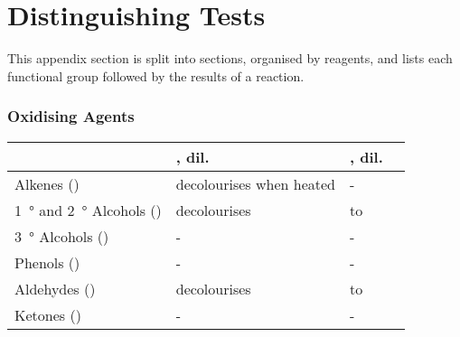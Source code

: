 
\pagebreak
\hypertarget{AppendixDistinguishingTests}{}
\part{Distinguishing Tests}

	This appendix section is split into sections, organised by reagents, and lists each functional group
	followed by the results of a reaction.

	\section{Oxidising Agents}

		\vspace{1em}
		\begin{center}
		\begin{longtabu} to \textwidth {| X[c,m] | X[c,m] | X[c,m] | N}

		\hline
							&	, dil. \ch{H2SO4}	&	 , dil. 	&\\[8mm]\hline

		Alkenes ()	&	 decolourises when heated	&	-
		&\\[12mm] \hline

		\SI{1}{\degree} and \SI{2}{\degree} Alcohols ()	& decolourises	&  to 
		&\\[12mm] \hline

		\SI{3}{\degree} Alcohols ()	&		-		&		-
		&\\[12mm] \hline

		Phenols ()	&		-		&		-
		&\\[12mm] \hline

		Aldehydes ()& decolourises	&  to 
		&\\[12mm] \hline

		Ketones ()	&		-		&		-
		&\\[12mm] \hline

		\end{longtabu}
		\end{center}



